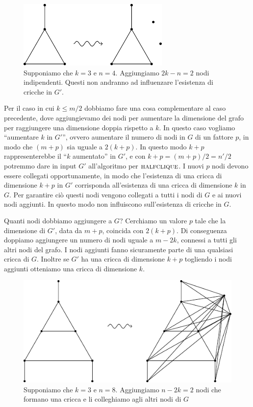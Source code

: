 \begin{figure}[h]
    \begin{center}
        \includegraphics{./img/NPClass/CLIHCLI1.pdf}
        \caption{Supponiamo che $k=3$ e $n=4$. Aggiungiamo $2k-n = 2$ nodi indipendenti. Questi non
        andranno ad influenzare l'esistenza di cricche in $G'$.}
    \end{center}
\end{figure}

Per il caso in cui $k \leq m/2$ dobbiamo fare una cosa complementare al caso precedente, dove
aggiungievamo dei nodi per aumentare la dimensione del grafo per raggiungere una dimensione doppia
rispetto a $k$. In questo caso vogliamo ``aumentare $k$ in $G'$'', ovvero aumentare il numero di
nodi in $G$ di un fattore $p$, in modo che $(m+p)$ sia uguale a $2(k+p)$. In questo modo $k + p$
rappresenterebbe il ``$k$ aumentato'' in $G'$, e con $k+p = (m+p)/2 = n'/2$ potremmo dare in input
$G'$ all'algoritmo per $\textsc{halfclique}$. I nuovi $p$ nodi devono essere collegati opportunamente, in
modo che l'esistenza di una cricca di dimensione $k+p$ in $G'$ corrisponda all'esistenza di una
cricca di dimensione $k$ in $G$. Per garantire ciò questi nodi vengono collegati a tutti i nodi di
$G$ e ai nuovi nodi aggiunti. In questo modo non influiscono sull'esistenza di cricche in $G$.

Quanti nodi dobbiamo aggiungere a $G$? Cerchiamo un valore $p$ tale che la dimensione di $G'$, data
da $m + p$, coincida con $2(k + p)$. Di conseguenza doppiamo aggiungere un numero di nodi uguale a
$m - 2k$, connessi a tutti gli altri nodi del grafo. I nodi aggiunti fanno sicuramente parte di una
qualsiasi cricca di $G$. Inoltre se $G'$ ha una cricca di dimensione $k+p$ togliendo i nodi aggiunti
otteniamo una cricca di dimensione $k$.

\begin{figure}[h]
    \begin{center}
        \includegraphics{./img/NPClass/CLIHCLI2.pdf}
        \caption{Supponiamo che $k=3$ e $n=8$. Aggiungiamo $n-2k = 2$ nodi che formano una cricca e
            li colleghiamo agli altri nodi di $G$}
    \end{center}
\end{figure}

